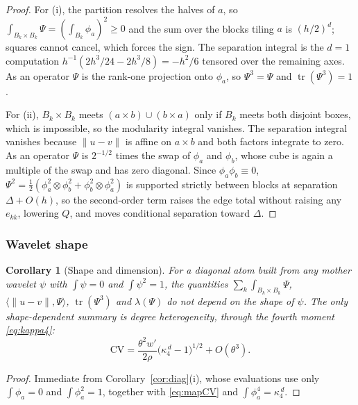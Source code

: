 \documentclass[11pt]{article}
\newtheorem{corollary}[theorem]{Corollary}
\theoremstyle{definition}
\newcommand{\1}{\mathbf 1}\newcommand{\op}{\operatorname}
\begin{document}
\begin{proof}
For (i), the partition resolves the halves of $a$, so
$\int_{B_k\times B_k}\Psi=(\int_{B_k}\phi_a)^{2}\ge0$ and the sum over the
blocks tiling $a$ is $(h/2)^{d}$; squares cannot cancel, which forces the sign.
The separation integral is the $d=1$ computation
$h^{-1}(2h^{3}/24-2h^{3}/8)=-h^{2}/6$ tensored over the remaining axes.  As an
operator $\Psi$ is the rank-one projection onto $\phi_a$, so $\Psi^{3}=\Psi$
and $\operatorname{tr}(\Psi^{3})=1$.

For (ii), $B_k\times B_k$ meets $(a\times b)\cup(b\times a)$ only if $B_k$
meets both disjoint boxes, which is impossible, so the modularity integral
vanishes.  The separation integral vanishes because $\|u-v\|$ is affine on
$a\times b$ and both factors integrate to zero.  As an operator $\Psi$ is
$2^{-1/2}$ times the swap of $\phi_a$ and $\phi_b$, whose cube is again a
multiple of the swap and has zero diagonal.  Since $\phi_a\phi_b\equiv0$,
$\Psi^{2}=\tfrac12(\phi_a^{2}\otimes\phi_b^{2}+\phi_b^{2}\otimes\phi_a^{2})$ is
supported strictly between blocks at separation $\Delta+O(h)$, so the
second-order term raises the edge total without raising any $e_{kk}$, lowering
$Q$, and moves conditional separation toward $\Delta$.
\end{proof}

\subsubsection{Wavelet shape}

\begin{corollary}[Shape and dimension]                       \label{cor:shape}
For a diagonal atom built from any mother wavelet $\psi$ with $\int\psi=0$
and $\int\psi^{2}=1$, the quantities $\sum_k\int_{B_k\times B_k}\Psi$,
$\langle\|u-v\|,\Psi\rangle$, $\operatorname{tr}(\Psi^{3})$ and
$\lambda(\Psi)$ do not depend on the shape of $\psi$.  The only
shape-dependent summary is degree heterogeneity, through the fourth moment
\eqref{eq:kappa4}:
\[
\mathrm{CV}=\frac{\theta^{2}w'}{2\rho}\bigl(\kappa_4^{\,d}-1\bigr)^{1/2}+O(\theta^{3}).
\]
\end{corollary}

\begin{proof}
Immediate from Corollary~\ref{cor:diag}(i), whose evaluations use only
$\int\phi_a=0$ and $\int\phi_a^{2}=1$, together with \eqref{eq:mapCV} and
$\int\phi_a^{4}=\kappa_4^{\,d}$.
\end{proof}
\end{document}
